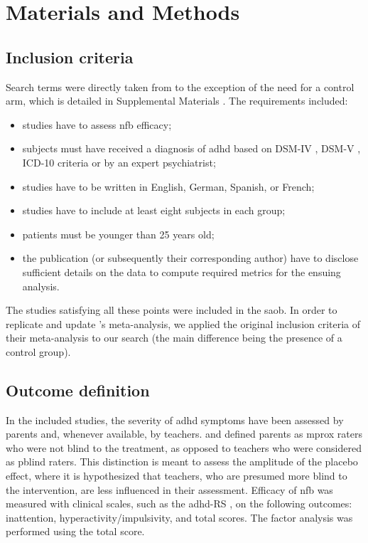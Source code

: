 

\section{Materials and Methods}

\subsection{Inclusion criteria}

Search terms were directly taken from \citet{Cortese2016} to the exception of the need for a control arm, 
which is detailed in Supplemental Materials \citep{Supplementalmaterial}. The requirements included:
\begin{itemize}
	\item studies have to assess \gls{nfb} efficacy; 
	\item subjects must have received a diagnosis of \gls{adhd} based on DSM-IV \citep{DSM-4}, DSM-V \citep{DSM-5}, 
	ICD-10 \citep{ICD101993} criteria or by an expert psychiatrist; 
	\item studies have to be written in English, German, Spanish, or French;
	\item studies have to include at least eight subjects in each group;
	\item patients must be younger than 25 years old;
  \item the publication (or subsequently their corresponding author) have to disclose sufficient details on the data
	to compute required metrics for the ensuing analysis.
\end{itemize} 
The studies satisfying all these points were included in the \gls{saob}.
In order to replicate and update \citeauthor{Cortese2016}'s meta-analysis, we applied the original inclusion criteria of 
their meta-analysis to our search (the main difference being the presence of a control group). 

\subsection{Outcome definition} 

In the included studies, the severity of \gls{adhd} symptoms have been assessed by parents and, whenever available, 
by teachers. \citet{Cortese2016} and \citet{Micoulaud2014} defined parents as \gls{mprox} raters who were 
not blind to the treatment, as opposed to teachers who were considered as \gls{pblind} raters. 
This distinction is meant to assess the amplitude of the placebo effect, where it is hypothesized that teachers, 
who are presumed more blind to the intervention, are less influenced in their assessment. 
Efficacy of \gls{nfb} was measured with clinical scales, such as the \gls{adhd}-RS \citep{Pappas2006}, 
on the following outcomes: inattention, hyperactivity/impulsivity, and total scores. The factor analysis was 
performed using the total score.

